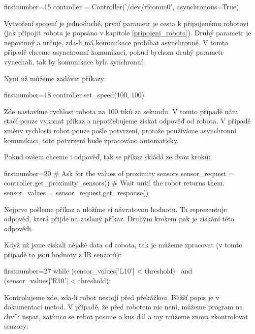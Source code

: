     \begin{pyc*}{firstnumber=15}
controller = Controller('/dev/rfcomm0', asynchronous=True)
    \end{pyc*}

    Vytvoření spojení je jednoduché, první parametr je cesta k připojenému
    robotovi (jak připojit robota je popsáno v kapitole
    \ref{pripojeni_robota}). Druhý parametr je nepovinný a určuje, zda-li má
    komunikace probíhat asynchronně. V tomto případě chceme asynchronní
    komunikaci, pokud bychom druhý parametr vynechali, tak by komunikace byla
    synchronní.

    Nyní už můžeme zadávat příkazy:

    \begin{pyc*}{firstnumber=18}
controller.set_speed(100, 100)
    \end{pyc*}

    Zde nastavíme rychlost robota na 100 tiků za sekundu. V tomto případě nám
    stačí pouze vykonat příkaz a nepotřebujeme získat odpověď od robota. V
    případě změny rychlosti robot pouze pošle potvrzení, protože používáme
    asynchronní komunikaci, toto potvrzení bude zpracováno automaticky.

    Pokud ovšem chceme i odpověď, tak se příkaz skládá ze dvou kroků:

    \begin{pyc*}{firstnumber=20}
# Ask for the values of proximity sensors
sensor_request = controller.get_proximity_sensors()
# Wait until the robot returns them.
sensor_values = sensor_request.get_response()
    \end{pyc*}

    Nejprve pošleme příkaz a uložíme si návratovou hodnotu. Ta reprezentuje
    odpověď, která přijde na zaslaný příkaz. Druhým krokem pak je získání této
    odpovědi.

    Když už jsme získali nějaké data od robota, tak je můžeme zpracovat (v
    tomto případě to jsou hodnoty z IR senzorů):

    \begin{pyc*}{firstnumber=27}
while (sensor_values['L10'] < threshold) \
       and (sensor_values['R10'] < threshold):
    \end{pyc*}

    Kontrolujeme zde, zda-li  robot nestojí před překážkou. Bližší popis je v
    dokumentaci metod. V případě, že před robotem nic není, můžeme program na
    chvíli uspat, zatímco se robot posune o kus dál a my můžeme znova
    zkontrolovat senzory:

